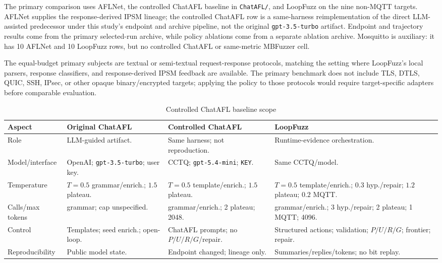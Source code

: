 \documentclass[final,5p,times,number]{elsarticle}
\begin{document}
The primary comparison uses AFLNet, the controlled ChatAFL baseline in \texttt{ChatAFL/}, and LoopFuzz on the nine non-MQTT targets. AFLNet supplies the response-derived IPSM lineage; the controlled ChatAFL row is a same-harness reimplementation of the direct LLM-assisted predecessor under this study's endpoint and archive pipeline, not the original \texttt{gpt-3.5-turbo} artifact. Endpoint and trajectory results come from the primary selected-run archive, while policy ablations come from a separate ablation archive. Mosquitto is auxiliary: it has 10 AFLNet and 10 LoopFuzz rows, but no controlled ChatAFL or same-metric MBFuzzer cell.

The equal-budget primary subjects are textual or semi-textual request-response protocols, matching the setting where LoopFuzz's local parsers, response classifiers, and response-derived IPSM feedback are available. The primary benchmark does not include TLS, DTLS, QUIC, SSH, IPsec, or other opaque binary/encrypted targets; applying the policy to those protocols would require target-specific adapters before comparable evaluation.

\begin{table}[!t]
\centering
\caption{Controlled ChatAFL baseline scope}
\label{tab:chatafl_config_scope}
{\scriptsize
\setlength{\tabcolsep}{3.0pt}
\renewcommand{\arraystretch}{1.12}
\begin{tabularx}{\textwidth}{>{\raggedright\arraybackslash}p{}
>{\raggedright\arraybackslash}X
>{\raggedright\arraybackslash}X
>{\raggedright\arraybackslash}X}
\toprule
Aspect & Original ChatAFL & Controlled ChatAFL & LoopFuzz \\
\midrule
Role &
LLM-guided artifact. &
Same harness; not reproduction. &
Runtime-evidence orchestration. \\
Model/interface &
OpenAI; \texttt{gpt-3.5-turbo}; user key. &
CCTQ; \texttt{gpt-5.4-mini}; \texttt{KEY}. &
Same CCTQ/model. \\
Temperature &
$T{=}0.5$ grammar/enrich.; $1.5$ plateau. &
$T{=}0.5$ template/enrich.; $1.5$ plateau. &
$T{=}0.5$ template/enrich.; $0.3$ hyp./repair; $1.2$ plateau; $0.2$ MQTT. \\
Calls/max tokens &
5 grammar; cap unspecified. &
5 grammar/enrich.; 2 plateau; 2048. &
5 grammar/enrich.; 3 hyp./repair; 2 plateau; 1 MQTT; 4096. \\
Control &
Templates; seed enrich.; open-loop. &
ChatAFL prompts; no $P/U/R/G$/repair. &
Structured actions; validation; $P/U/R/G$; frontier; repair. \\
Reproducibility &
Public model state. &
Endpoint changed; lineage only. &
Summaries/replies/tokens; no bit replay. \\
\bottomrule
\end{tabularx}
}
\end{table}
\end{document}
